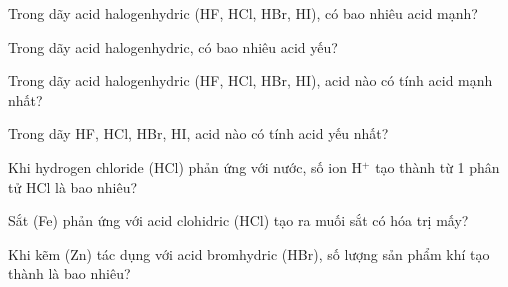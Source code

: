 \documentclass[Main.tex]{subfiles}
\begin{document}
    \begin{bt}
    Trong dãy acid halogenhydric (HF, HCl, HBr, HI), có bao nhiêu acid mạnh?
    \end{bt}
    
    \begin{bt}
    Trong dãy acid halogenhydric, có bao nhiêu acid yếu?
    \end{bt}
    
    \begin{bt}
    Trong dãy acid halogenhydric (HF, HCl, HBr, HI), acid nào có tính acid mạnh nhất?
    \end{bt}
    
    \begin{bt}
    Trong dãy HF, HCl, HBr, HI, acid nào có tính acid yếu nhất? 
    \end{bt}
    
    \begin{bt}
    Khi hydrogen chloride (HCl) phản ứng với nước, số ion H$^+$ tạo thành từ 1 phân tử HCl là bao nhiêu?
    \end{bt}
    
    
    \begin{bt}
    Sắt (Fe) phản ứng với acid clohidric (HCl) tạo ra muối sắt có hóa trị mấy?
    \end{bt}
    
    \begin{bt}
    Khi kẽm (Zn) tác dụng với acid bromhydric (HBr), số lượng sản phẩm khí tạo thành là bao nhiêu?
    \end{bt}
    
\end{document}
